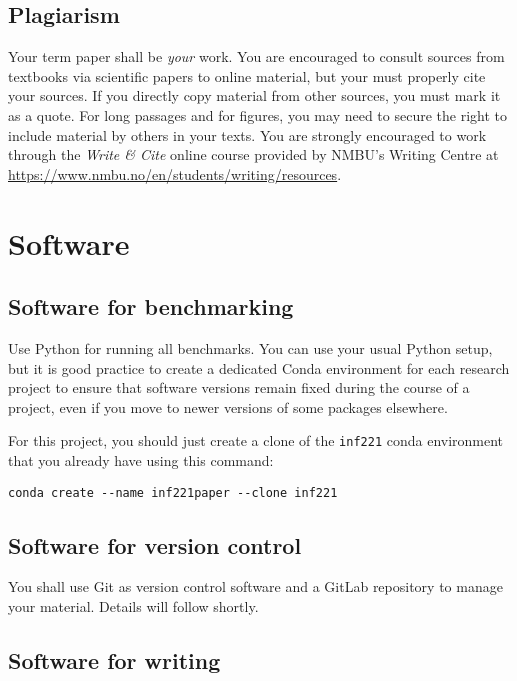 \documentclass[sigconf, nonacm, natbib, screen, balance=False]{acmart}
\begin{document}
\subsection{Plagiarism}\label{sec:plag}

Your term paper shall be \emph{your} work. You are encouraged to
consult sources from textbooks via scientific papers to online
material, but your must properly cite your sources. If you directly
copy material from other sources, you must mark it as a quote. For
long passages and for figures, you may need to secure the right to
include material by others in your texts. You are strongly encouraged
to work through the \emph{Write \& Cite} online course provided by
NMBU's Writing Centre at
\url{https://www.nmbu.no/en/students/writing/resources}.


\section{Software}\label{sec:sw}

\subsection{Software for benchmarking}\label{sec:swb}

Use Python for running all benchmarks. You can use your usual Python
setup, but it is good practice to create a dedicated Conda environment
for each research project to ensure that software versions remain
fixed during the course of a project, even if you move to newer
versions of some packages elsewhere.

For this project, you should just create a clone of the
\texttt{inf221} conda environment that you already have using this command:
\begin{verbatim}
conda create --name inf221paper --clone inf221
\end{verbatim}


\subsection{Software for version control}\label{sec:swvc}

You shall use Git as version control software and a GitLab repository
to manage your material. Details will follow shortly.


\subsection{Software for writing}\label{sec:swtex}
\end{document}
